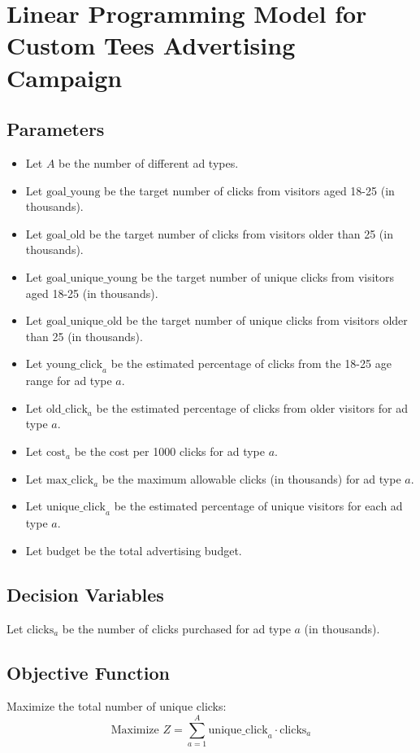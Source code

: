 \documentclass{article}
\begin{document}
\section*{Linear Programming Model for Custom Tees Advertising Campaign}

\subsection*{Parameters}
\begin{itemize}
    \item Let \( A \) be the number of different ad types.
    \item Let \( \text{goal\_young} \) be the target number of clicks from visitors aged 18-25 (in thousands).
    \item Let \( \text{goal\_old} \) be the target number of clicks from visitors older than 25 (in thousands).
    \item Let \( \text{goal\_unique\_young} \) be the target number of unique clicks from visitors aged 18-25 (in thousands).
    \item Let \( \text{goal\_unique\_old} \) be the target number of unique clicks from visitors older than 25 (in thousands).
    \item Let \( \text{young\_click}_{a} \) be the estimated percentage of clicks from the 18-25 age range for ad type \( a \).
    \item Let \( \text{old\_click}_{a} \) be the estimated percentage of clicks from older visitors for ad type \( a \).
    \item Let \( \text{cost}_{a} \) be the cost per 1000 clicks for ad type \( a \).
    \item Let \( \text{max\_click}_{a} \) be the maximum allowable clicks (in thousands) for ad type \( a \).
    \item Let \( \text{unique\_click}_{a} \) be the estimated percentage of unique visitors for each ad type \( a \).
    \item Let \( \text{budget} \) be the total advertising budget.
\end{itemize}

\subsection*{Decision Variables}
Let \( \text{clicks}_{a} \) be the number of clicks purchased for ad type \( a \) (in thousands).

\subsection*{Objective Function}
Maximize the total number of unique clicks:
\[
\text{Maximize } Z = \sum_{a=1}^{A} \text{unique\_click}_{a} \cdot \text{clicks}_a
\]
\end{document}
